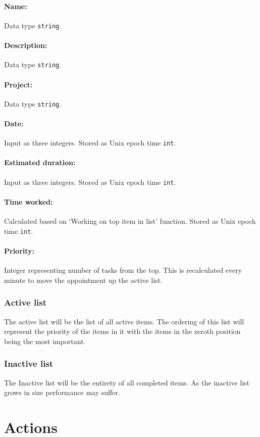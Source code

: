 \documentclass[12pt]{article}
\newcommand{\e}[1] {{\tt #1}}
\begin{document}
\paragraph{Name:} Data type \e{string}.
\paragraph{Description:} Data type \e{string}.
\paragraph{Project:} Data type \e{string}.
\paragraph{Date:} Input as three integers. Stored as Unix epoch time \e{int}.
\paragraph{Estimated duration:} Input as three integers. Stored as Unix epoch time \e{int}.
\paragraph{Time worked:} Calculated based on `Working on top item in list' function. Stored as Unix epoch time \e{int}. 
\paragraph{Priority:} Integer representing number of tasks from the top. This is recalculated every minute to move the appointment up the active list.

\subsubsection{Active list} \label{sec:Active list}
The active list will be the list of all active items. The ordering of this list will represent the priority of the items in it with the items in the zeroth position being the most important.

\subsubsection{Inactive list} \label{sec:Inactive list}
The Inactive list will be the entirety of all completed items. As the inactive list grows in size performance may suffer. 

\section{Actions} \label{sec:Actions}
\end{document}
